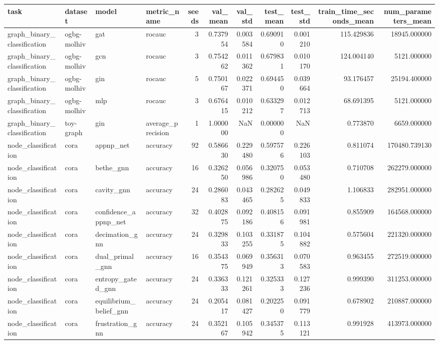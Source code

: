 \begin{tabular}{llllrrrrrrr}
\toprule
task & dataset & model & metric_name & seeds & val_mean & val_std & test_mean & test_std & train_time_seconds_mean & num_parameters_mean \\
\midrule
graph_binary_classification & ogbg-molhiv & gat & rocauc & 3 & 0.737954 & 0.003584 & 0.690910 & 0.001210 & 115.429836 & 18945.000000 \\
graph_binary_classification & ogbg-molhiv & gcn & rocauc & 3 & 0.754262 & 0.011362 & 0.679831 & 0.010170 & 124.004140 & 5121.000000 \\
graph_binary_classification & ogbg-molhiv & gin & rocauc & 5 & 0.750167 & 0.022371 & 0.694450 & 0.039664 & 93.176457 & 25194.400000 \\
graph_binary_classification & ogbg-molhiv & mlp & rocauc & 3 & 0.676415 & 0.010212 & 0.633297 & 0.012713 & 68.691395 & 5121.000000 \\
graph_binary_classification & toy-graph & gin & average_precision & 1 & 1.000000 & NaN & 0.000000 & NaN & 0.773870 & 6659.000000 \\
node_classification & cora & appnp_net & accuracy & 92 & 0.586630 & 0.229480 & 0.597576 & 0.226103 & 0.811074 & 170480.739130 \\
node_classification & cora & bethe_gnn & accuracy & 16 & 0.326250 & 0.056986 & 0.320750 & 0.053480 & 0.710708 & 262279.000000 \\
node_classification & cora & cavity_gnn & accuracy & 24 & 0.286083 & 0.043465 & 0.282625 & 0.049833 & 1.106833 & 282951.000000 \\
node_classification & cora & confidence_appnp_net & accuracy & 32 & 0.402875 & 0.092186 & 0.408156 & 0.091981 & 0.855909 & 164568.000000 \\
node_classification & cora & decimation_gnn & accuracy & 24 & 0.329833 & 0.103255 & 0.331875 & 0.104882 & 0.575604 & 221320.000000 \\
node_classification & cora & dual_primal_gnn & accuracy & 16 & 0.354375 & 0.069949 & 0.356313 & 0.070583 & 0.963455 & 272519.000000 \\
node_classification & cora & entropy_gated_gnn & accuracy & 24 & 0.336333 & 0.121261 & 0.325333 & 0.127236 & 0.999390 & 311253.000000 \\
node_classification & cora & equilibrium_belief_gnn & accuracy & 24 & 0.205417 & 0.081427 & 0.202250 & 0.091779 & 0.678902 & 210887.000000 \\
node_classification & cora & frustration_gnn & accuracy & 24 & 0.352167 & 0.105942 & 0.345375 & 0.113121 & 0.991928 & 413973.000000 \\

\end{tabular}
